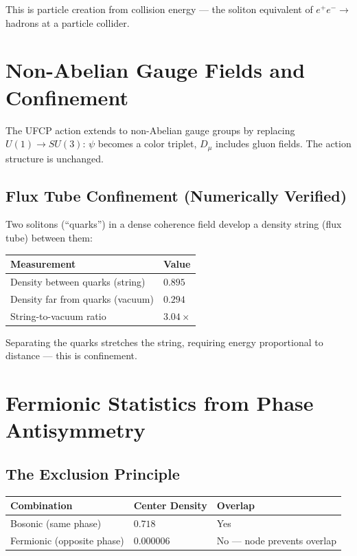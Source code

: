\documentclass[11pt, a4paper]{article}
\begin{document}
This is particle creation from collision energy --- the soliton
equivalent of $e^+e^- \to$ hadrons at a particle collider.

\section{Non-Abelian Gauge Fields and Confinement}

The UFCP action extends to non-Abelian gauge groups by replacing
$U(1) \to SU(3)$: $\psi$ becomes a color triplet, $D_\mu$ includes
gluon fields. The action structure is unchanged.

\subsection{Flux Tube Confinement (Numerically Verified)}

Two solitons (``quarks'') in a dense coherence field develop a
density string (flux tube) between them:

\begin{center}
\begin{tabular}{@{}ll@{}}
\toprule
\textbf{Measurement} & \textbf{Value} \\
\midrule
Density between quarks (string) & $0.895$ \\
Density far from quarks (vacuum) & $0.294$ \\
String-to-vacuum ratio & $3.04\times$ \\
\bottomrule
\end{tabular}
\end{center}

Separating the quarks stretches the string, requiring energy
proportional to distance --- this is confinement.

\section{Fermionic Statistics from Phase Antisymmetry}

\subsection{The Exclusion Principle}

\begin{center}
\begin{tabular}{@{}lll@{}}
\toprule
\textbf{Combination} & \textbf{Center Density} & \textbf{Overlap} \\
\midrule
Bosonic (same phase) & $0.718$ & Yes \\
Fermionic (opposite phase) & $0.000006$ & No --- node prevents overlap \\
\bottomrule
\end{tabular}
\end{center}
\end{document}
